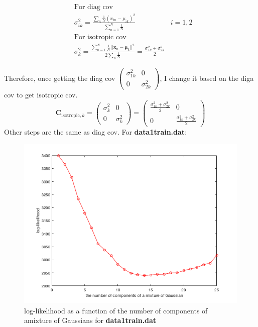 \documentclass{article}
\renewcommand{\vec}[1]{\ensuremath{\mathbf{#1}}}
\begin{document}
\begin{equation}
\begin{aligned}
& \mbox{For diag cov}\\
& \sigma_{ik}^{2} = \frac{\sum_n \frac{1}{N}(x_{in}-\mu_{ik})^2}{\sum_{n=1}^{N} \frac{1}{N}} & i = 1,2 \\
& \mbox{For isotropic cov} \\
& \sigma_{k}^{2} = \frac{\sum_{n=1}^{N} \frac{1}{N}||\vec{x}_{n}-\vec{\mu}_{k}||^2}{2 \sum_n \frac{1}{N}} =  \frac{\sigma_{1k}^{2}+\sigma_{2k}^{2}}{2}
\end{aligned}
\end{equation}

Therefore, once getting the diag cov $\left( \begin{array}{cc}  \sigma_{1k}^{2} & 0 \\ 0 & \sigma_{2k}^{2}
    \end{array} \right)$, I change it based on the diga cov to get isotropic cov.
\begin{equation}
    \textbf{C}_{\mbox{isotropic},k}  = \left( \begin{array}{cc}  \sigma_{k}^{2} & 0 \\ 0 & \sigma_{k}^{2} 
    \end{array} \right)  = \left( \begin{array}{cc}  \frac{\sigma_{1k}^{2}+\sigma_{2k}^{2}}{2} & 0 \\ 0 & \frac{\sigma_{1k}^{2}+\sigma_{2k}^{2}}{2} 
    \end{array} \right)
\end{equation}
Other steps are the same as diag cov.
\newpage
For \textbf{data1train.dat}:

\begin{figure}[h!]
\centering
\includegraphics[scale=0.6]{fig/HW6P1_11.png}
\caption{log-likelihood as a function of the number of components of amixture of Gaussians for \textbf{data1train.dat}}
\end{figure}
\end{document}
